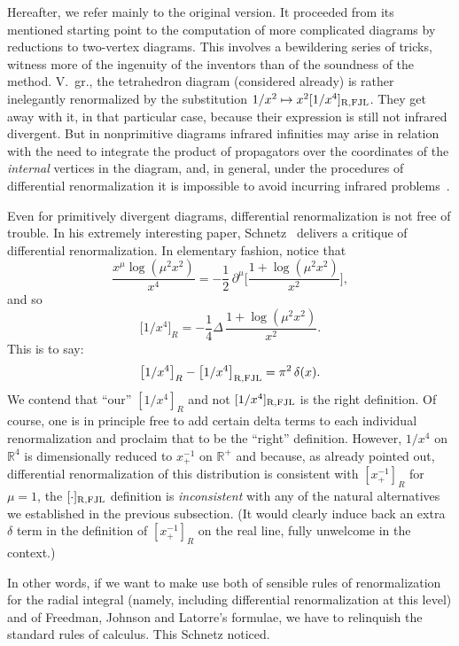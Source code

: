 \documentclass[a4paper,12pt]{article}
\newcommand{\Dl}{\Delta}           %
\newcommand{\del}{\partial}        %
\newcommand{\dl}{\delta}           %
\newcommand{\R}{\mathbb{R}}        %
\newcommand{\7}{\dagger}           %
\theoremstyle{plain}
\theoremstyle{definition}
\begin{document}
Hereafter, we refer mainly to the original version. It proceeded from
its mentioned starting point to the computation of more complicated
diagrams by reductions to two-vertex diagrams. This involves a
bewildering series of tricks, witness more of the ingenuity of the
inventors than of the soundness of the method. V.~gr., the tetrahedron
diagram (considered already) is rather inelegantly renormalized by the
substitution $1/x^2 \mapsto x^2[1/x^4]_{\rm R,FJL}$. They get away
with it, in that particular case, because their expression is still
not infrared divergent. But in nonprimitive diagrams infrared
infinities may arise in relation with the need to integrate the
product of propagators over the coordinates of the \textit{internal}
vertices in the diagram, and, in general, under the procedures of
differential renormalization it is impossible to avoid incurring
infrared problems~\cite{SmirIR}.

Even for primitively divergent diagrams, differential renormalization
is not free of trouble. In his extremely interesting paper,
Schnetz~\cite{NR} delivers a critique of differential renormalization.
In elementary fashion, notice that
$$
\frac{x^\mu\log(\mu^2x^2)}{x^4} =
-\frac{1}{2}\,\del^\mu \biggl[\frac{1+\log(\mu^2x^2)}{x^2}\biggr],
$$
and so
$$
\bigl[1/x^4\bigr]_R = -\frac{1}{4} \Dl\,\frac{1+\log(\mu^2x^2)}{x^2}.
$$
This is to say:
\begin{equation}
\bigl[1/x^4\bigr]_R - \bigl[1/x^4\bigr]_{\rm R,FJL} = \pi^2\,\dl(x).
\label{eq:micro-machinebis}
\end{equation}
We contend that ``our'' $[1/x^4]_R$ and not $[1/x^4]_{\rm R,FJL}$ is
the right definition. Of course, one is in principle free to add
certain delta terms to each individual renormalization and proclaim
that to be the ``right'' definition. However, $1/x^4$ on $\R^4$ is
dimensionally reduced to $x^{-1}_+$ on $\R^+$ and because, as already
pointed out, differential renormalization of this distribution is
consistent with $[x^{-1}_+]_R$ for $\mu=1$, the $[\cdot]_{\rm R,FJL}$
definition is \textit{inconsistent} with any of the natural
alternatives we established in the previous subsection. (It would
clearly induce back an extra $\dl$ term in the definition of
$[x^{-1}_+]_R$ on the real line, fully unwelcome in the context.)

In other words, if we want to make use both of sensible rules of
renormalization for the radial integral (namely, including
differential renormalization at this level) and of Freedman, Johnson
and Latorre's formulae, we have to relinquish the standard rules of
calculus. This Schnetz noticed.
\end{document}
